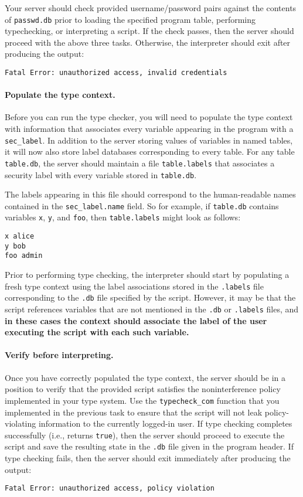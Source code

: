 \documentclass[11pt]{article}
\begin{document}
{Your server should check provided username/password pairs against the contents of \verb'passwd.db' prior to loading the 
specified program table, performing typechecking, or interpreting a script. If the check passes, then the server should 
proceed with the above three tasks. Otherwise, the interpreter should exit after producing the output: 
\begin{center}
\verb'Fatal Error: unauthorized access, invalid credentials'
\end{center}

\paragraph{Populate the type context.} Before you can run the type checker, you will need to populate the type context 
with information that associates every variable appearing in the program with a \verb'sec_label'. In addition to the 
server storing values of variables in named tables, it will now also store label databases corresponding to every table. 
For any table \verb'table.db', the server should maintain a file \verb'table.labels' that associates a security label 
with every variable stored in \verb'table.db'. 

The labels appearing in this file should correspond to the human-readable names contained in the \verb'sec_label.name' 
field. So for example, if \verb'table.db' contains variables \verb'x', \verb'y', and \verb'foo', then \verb'table.labels'
 might look as follows:
\begin{lstlisting}
x alice
y bob
foo admin
\end{lstlisting}
Prior to performing type checking, the interpreter should start by populating a fresh type context using the label 
associations stored in the \verb'.labels' file corresponding to the \verb'.db' file specified by the script. 
However, it may be that the script references variables that are not mentioned in the \verb'.db' or \verb'.labels' files, 
and \textbf{in these cases the context should associate the label of the user executing the script with each such variable.}

\paragraph{Verify before interpreting.} Once you have correctly populated the type context, the server should be in a 
position to verify that the provided script satisfies the noninterference policy implemented in your type system. 
Use the \verb'typecheck_com' function that you implemented in the previous task to ensure that the script will not 
leak policy-violating information to the currently logged-in user. If type checking completes successfully (i.e., 
returns \verb'true'), then the server should proceed to execute the script and save the resulting state in the 
\verb'.db' file given in the program header. If type checking fails, then the server should exit immediately after 
producing the output:
\begin{center}
\verb'Fatal Error: unauthorized access, policy violation'
\end{center}

}
\end{document}
